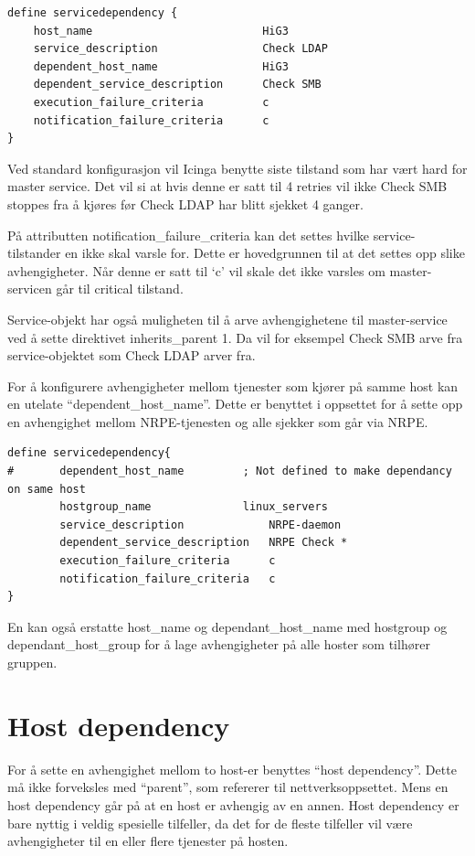 \begin{lstlisting}
define servicedependency {
	host_name                          HiG3
	service_description                Check LDAP
	dependent_host_name                HiG3
	dependent_service_description      Check SMB
	execution_failure_criteria         c
	notification_failure_criteria      c
}
\end{lstlisting}

Ved standard konfigurasjon vil Icinga benytte siste tilstand som har vært hard for master service. Det vil si at hvis denne er satt til 4 retries vil ikke Check SMB stoppes fra å kjøres før Check LDAP har blitt sjekket 4 ganger. 

På attributten notification\_failure\_criteria kan det settes hvilke service-tilstander en ikke skal varsle for. Dette er hovedgrunnen til at det settes opp slike avhengigheter. Når denne er satt til ‘c’ vil skale det ikke varsles om master-servicen går til critical tilstand.

Service-objekt har også muligheten til å arve avhengighetene til master-service ved å sette direktivet inherits\_parent 1. Da vil for eksempel Check SMB arve fra service-objektet som Check LDAP arver fra.

For å konfigurere avhengigheter mellom tjenester som kjører på samme host kan en utelate “dependent\_host\_name”. Dette er benyttet i oppsettet for å sette opp en avhengighet mellom NRPE-tjenesten og alle sjekker som går via NRPE.

\begin{lstlisting}
define servicedependency{
#       dependent_host_name   		; Not defined to make dependancy on same host            
        hostgroup_name           	linux_servers
        service_description         	NRPE-daemon
        dependent_service_description   NRPE Check *
        execution_failure_criteria      c
        notification_failure_criteria   c
}
\end{lstlisting}

En kan også erstatte host\_name og dependant\_host\_name med hostgroup og dependant\_host\_group for å lage avhengigheter på alle hoster som tilhører gruppen.

\section{Host dependency}

For å sette en avhengighet mellom to host-er benyttes “host dependency”. Dette må ikke forveksles med “parent”, som refererer til nettverksoppsettet. Mens en host dependency går på at en host er avhengig av en annen. Host dependency er bare nyttig i veldig spesielle tilfeller, da det for de fleste tilfeller vil være avhengigheter til en eller flere tjenester på hosten. 

